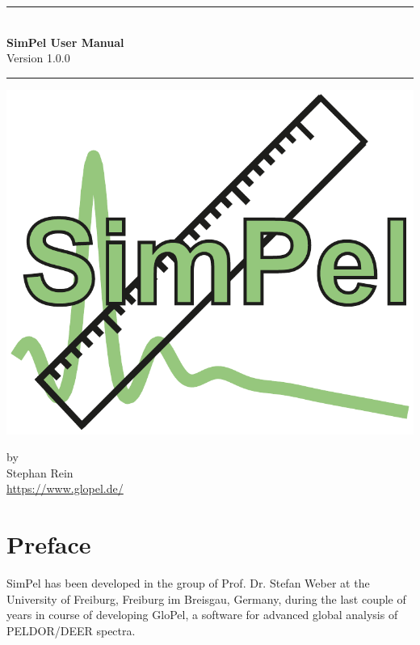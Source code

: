 \documentclass[pdftex,bezier,german,a4,twoside, headexclude,12pt,nochapterprefix, titlepage]{extarticle}
\newcommand{\simpel}{\textsf{SimPel}}
\newcommand{\glopel}{\textsf{GloPel}}
\begin{document}
\begin{titlepage}
\centering

\vspace*{3em}

\rule{\textwidth}{2pt}
\\[1.5em]
\textbf{\Large \simpel{} User Manual}
\\[1em]
{\large Version 1.0.0}
\\[1em]
\rule{\textwidth}{2pt}

\vspace*{3em}

\includegraphics[scale=0.65]{SimPel_Logo.pdf}

\vspace*{3em}

by \\[1em]
{\Large Stephan Rein}\\[2em]
{\large \url{https://www.glopel.de/}}

\end{titlepage}


\tableofcontents

\clearpage

\section*{Preface}

\simpel{} has been developed in the group of Prof. Dr. Stefan Weber at the University of Freiburg, Freiburg im Breisgau, Germany, during the last couple of years in course of developing \glopel, a software for advanced global analysis of PELDOR/DEER spectra.
\end{document}
